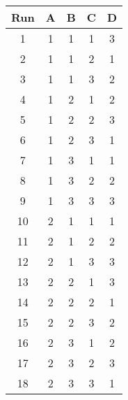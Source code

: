 \begin{table}[]
    \scriptsize
    \centering
    \begin{tabular}{@{}ccccc@{}}
        \toprule
        Run & A & B & C & D \\ \midrule
        \cellcolor{gray!18}1 & \cellcolor{green!25}1 & \cellcolor{green!25}1 & \cellcolor{green!25}1 & \cellcolor{red!25}3 \\
        \cellcolor{gray!18}2 & \cellcolor{green!25}1 & \cellcolor{green!25}1 & \cellcolor{cyan!25}2 & \cellcolor{green!25}1 \\
        \cellcolor{gray!18}3 & \cellcolor{green!25}1 & \cellcolor{green!25}1 & \cellcolor{red!25}3 & \cellcolor{cyan!25}2 \\
        \cellcolor{gray!18}4 & \cellcolor{green!25}1 & \cellcolor{cyan!25}2 & \cellcolor{green!25}1 & \cellcolor{cyan!25}2 \\
        \cellcolor{gray!18}5 & \cellcolor{green!25}1 & \cellcolor{cyan!25}2 & \cellcolor{cyan!25}2 & \cellcolor{red!25}3 \\
        \cellcolor{gray!18}6 & \cellcolor{green!25}1 & \cellcolor{cyan!25}2 & \cellcolor{red!25}3 & \cellcolor{green!25}1 \\
        \cellcolor{gray!18}7 & \cellcolor{green!25}1 & \cellcolor{red!25}3 & \cellcolor{green!25}1 & \cellcolor{green!25}1 \\
        \cellcolor{gray!18}8 & \cellcolor{green!25}1 & \cellcolor{red!25}3 & \cellcolor{cyan!25}2 & \cellcolor{cyan!25}2 \\
        \cellcolor{gray!18}9 & \cellcolor{green!25}1 & \cellcolor{red!25}3 & \cellcolor{red!25}3 & \cellcolor{red!25}3 \\
        \cellcolor{gray!18}10 & \cellcolor{cyan!25}2 & \cellcolor{green!25}1 & \cellcolor{green!25}1 & \cellcolor{green!25}1 \\
        \cellcolor{gray!18}11 & \cellcolor{cyan!25}2 & \cellcolor{green!25}1 & \cellcolor{cyan!25}2 & \cellcolor{cyan!25}2 \\
        \cellcolor{gray!18}12 & \cellcolor{cyan!25}2 & \cellcolor{green!25}1 & \cellcolor{red!25}3 & \cellcolor{red!25}3 \\
        \cellcolor{gray!18}13 & \cellcolor{cyan!25}2 & \cellcolor{cyan!25}2 & \cellcolor{green!25}1 & \cellcolor{red!25}3 \\
        \cellcolor{gray!18}14 & \cellcolor{cyan!25}2 & \cellcolor{cyan!25}2 & \cellcolor{cyan!25}2 & \cellcolor{green!25}1 \\
        \cellcolor{gray!18}15 & \cellcolor{cyan!25}2 & \cellcolor{cyan!25}2 & \cellcolor{red!25}3 & \cellcolor{cyan!25}2 \\
        \cellcolor{gray!18}16 & \cellcolor{cyan!25}2 & \cellcolor{red!25}3 & \cellcolor{green!25}1 & \cellcolor{cyan!25}2 \\
        \cellcolor{gray!18}17 & \cellcolor{cyan!25}2 & \cellcolor{red!25}3 & \cellcolor{cyan!25}2 & \cellcolor{red!25}3 \\
        \cellcolor{gray!18}18 & \cellcolor{cyan!25}2 & \cellcolor{red!25}3 & \cellcolor{red!25}3 & \cellcolor{green!25}1 \\ \bottomrule
    \end{tabular}
\end{table}
